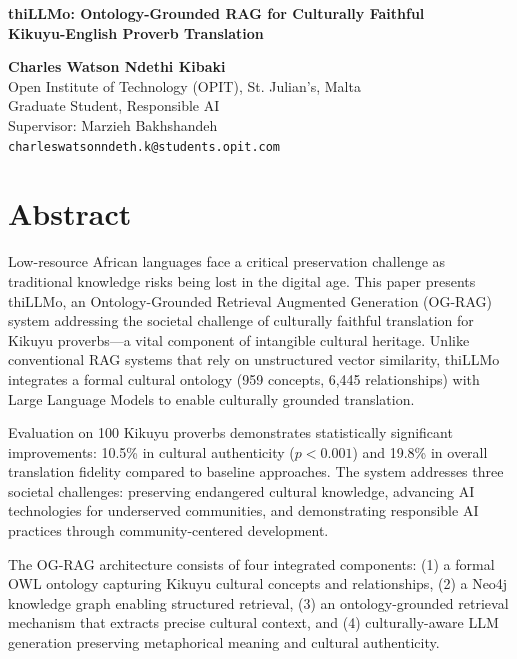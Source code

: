 \documentclass[11pt,a4paper]{article}
\begin{document}
\begin{center}
{\LARGE\bfseries thiLLMo: Ontology-Grounded RAG for Culturally Faithful\\Kikuyu-English Proverb Translation}
\end{center}

\vspace{5pt}

\begin{center}
\textbf{Charles Watson Ndethi Kibaki}\\
Open Institute of Technology (OPIT), St. Julian's, Malta\\
Graduate Student, Responsible AI\\
Supervisor: Marzieh Bakhshandeh\\
\texttt{charleswatsonndeth.k@students.opit.com}
\end{center}

\vspace{10pt}

\section*{Abstract}

Low-resource African languages face a critical preservation challenge as traditional knowledge risks being lost in the digital age. This paper presents thiLLMo, an Ontology-Grounded Retrieval Augmented Generation (OG-RAG) system addressing the societal challenge of culturally faithful translation for Kikuyu proverbs---a vital component of intangible cultural heritage. Unlike conventional RAG systems that rely on unstructured vector similarity, thiLLMo integrates a formal cultural ontology (959 concepts, 6,445 relationships) with Large Language Models to enable culturally grounded translation.

Evaluation on 100 Kikuyu proverbs demonstrates statistically significant improvements: 10.5\% in cultural authenticity ($p < 0.001$) and 19.8\% in overall translation fidelity compared to baseline approaches. The system addresses three societal challenges: preserving endangered cultural knowledge, advancing AI technologies for underserved communities, and demonstrating responsible AI practices through community-centered development.

The OG-RAG architecture consists of four integrated components: (1) a formal OWL ontology capturing Kikuyu cultural concepts and relationships, (2) a Neo4j knowledge graph enabling structured retrieval, (3) an ontology-grounded retrieval mechanism that extracts precise cultural context, and (4) culturally-aware LLM generation preserving metaphorical meaning and cultural authenticity.
\end{document}
